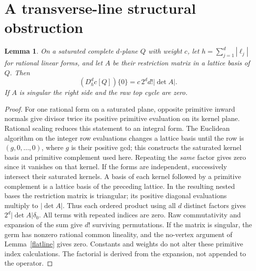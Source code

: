 \documentclass[11pt]{article}
\newtheorem{lemma}[theorem]{Lemma}
\begin{document}
\section{A transverse-line structural obstruction}
\begin{lemma}\label{detmass}
On a saturated complete $d$-plane $Q$ with weight $c$, let
$h=\sum_{j=1}^d|\ell_j|$ for rational linear forms, and let $A$
be their restriction matrix in a lattice basis of $Q$. Then
\[
             (D_h^d c[Q])\{0\}=c\,2^d d!|\det A|.
\]
If $A$ is singular the right side and the raw top cycle are zero.
\end{lemma}
\begin{proof}
For one rational form on a saturated plane, opposite primitive inward
normals give divisor twice its positive primitive evaluation on its
kernel plane. Rational scaling reduces this statement to an integral
form. The Euclidean algorithm on the integer row evaluations changes
a lattice basis until the row is $(g,0,\ldots,0)$, where $g$ is their
positive gcd; this constructs the saturated kernel basis and primitive
complement used here. Repeating the \emph{same} factor gives zero since it vanishes
on that kernel. If the forms are independent, successively intersect
their saturated kernels. A basis of each kernel followed by a primitive
complement is a lattice basis of the preceding lattice. In the resulting
nested bases the restriction matrix is triangular; its positive diagonal
evaluations multiply to $|\det A|$. Thus each ordered product using
all $d$ distinct factors gives $2^d|\det A|\delta_0$. All terms with
repeated indices are zero. Raw commutativity and expansion of the sum
give $d!$ surviving permutations. If the matrix is singular, the germ
has nonzero rational common lineality, and the no-vertex argument of
Lemma~\ref{flatline} gives zero. Constants and weights do not alter
these primitive index calculations. The factorial is derived from the
expansion, not appended to the operator.
\end{proof}
\end{document}
